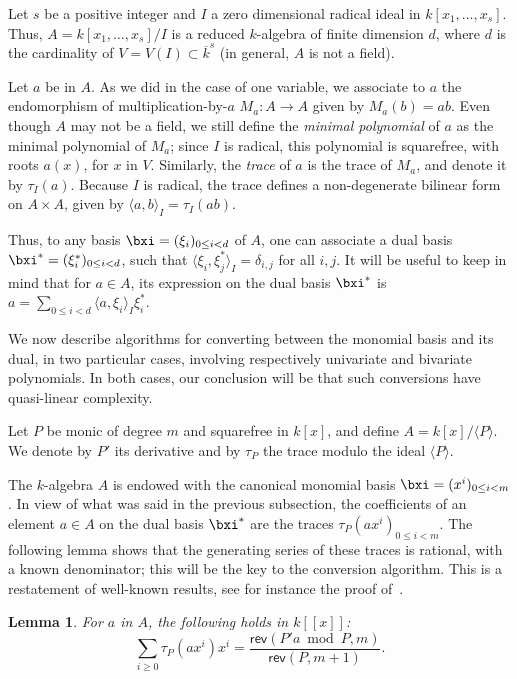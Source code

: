 \documentclass{sig-alternate}
\def\rev {\ensuremath{\mathsf{rev}}}
\newcounter{algo}
\newcommand{\ang}[1]{\langle#1\rangle}
\newtheorem{Lemma}{Lemma}
\begin{document}
\smallskip{} 
Let $s$ be a positive integer and $I$ a zero dimensional radical ideal
in $k[x_1,\dots,x_s]$. Thus, $A=k[x_1,\dots,x_s]/I$ is a reduced
$k$-algebra of finite dimension $d$, where $d$ is the cardinality of
$V=V(I) \subset\overline{k}^s$ (in general, $A$ is not a field).

Let $a$ be in $A$. As we did in the case of one variable, we associate
to $a$ the endomorphism of multiplication-by-$a$ $M_a: A \to A$ given
by $M_a(b)=ab$.  Even though $A$ may not be a field, we still define
the {\em minimal polynomial} of $a$ as the minimal polynomial of
$M_a$; since $I$ is radical, this polynomial is squarefree, with roots
$a(x)$, for $x$ in $V$. Similarly, the \emph{trace} of $a$
is the trace of $M_a$, and denote it by $\tau_I(a)$. Because $I$
is radical, the trace defines a non-degenerate bilinear form on
$A\times A$, given by $\ang{a,b}_I = \tau_I(ab)$.

Thus, to any basis $\bxi=(\xi_i)_{0 \le i < d}$ of $A$, one can
associate a dual basis $\bxi^\ast=(\xi^\ast_i)_{0 \le i < d}$,
such that $\ang{\xi_i, \xi^\ast_j}_I=\delta_{i,j}$ for all
$i,j$.  It will be useful to keep in mind that for $a \in A$, its
expression on the dual basis $\bxi^\ast$ is $a=\sum_{0 \le i < d}
\ang{a,\xi_i}_I \xi^\ast_i$.

We now describe algorithms for converting between the monomial basis and its
dual, in two particular cases, involving respectively univariate
and bivariate polynomials. In both cases, our conclusion will be that
such conversions have quasi-linear complexity.

\smallskip{} 
Let $P$ be monic of degree $m$ and squarefree in $k[x]$, and define
$A=k[x]/\ang{P}$. We denote by $P'$ its derivative and by $\tau_P$ the trace modulo the ideal $\ang{P}$.

The $k$-algebra $A$ is endowed with the canonical monomial basis
$\bxi=(x^i)_{0 \le i < m}$. In view of what was said in the previous
subsection, the coefficients of an element $a \in A$ on the dual basis
$\bxi^\ast$ are the traces $\tau_P(ax^i)_{0 \le i < m}$. The following
lemma shows that the generating series of these traces is rational,
with a known denominator; this will be the key to the conversion
algorithm. This is a restatement of well-known results, see for
instance the proof of~\cite[Theorem~3.1]{rouiller99}.

\begin{Lemma}\label{lemma:trace:1}
  For $a$ in $A$, the following
  holds in $k[[x]]$:
  $$\sum_{i \ge 0} \tau_P(a x^i) x^i = \frac{\rev( P' a \bmod P,m)}{\rev(P,m+1)}.$$
\end{Lemma}
\end{document}
